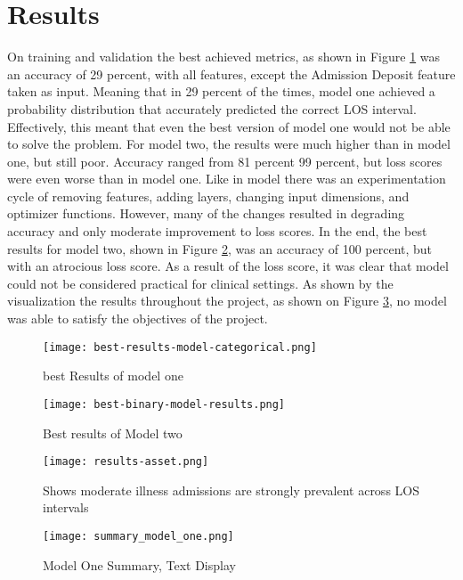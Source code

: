 \documentclass[sigconf,authorversion]{acmart}
\begin{document}
\section{Results}
 On training and validation the best achieved metrics, as shown in Figure \ref{fig: best_metric_model_one} was an accuracy of 29 percent, with all features, except the Admission Deposit feature taken as input. Meaning that in 29 percent of the times, model one achieved a probability distribution that accurately predicted the correct LOS interval. Effectively, this meant that even the best version of model one would not be able to solve the problem.
 For model two, the results were much higher than in model one, but still poor. Accuracy ranged from 81 percent 99 percent, but loss scores were even worse than in model one. Like in model there was an experimentation cycle of removing features, adding layers, changing input dimensions, and optimizer functions. However, many of the changes resulted in degrading accuracy and only moderate improvement to loss scores. In the end, the best results for model two, shown in Figure \ref{fig: best_metric_model_two}, was an accuracy of 100 percent, but with an atrocious loss score. As a result of the loss score, it was clear that model could not be considered practical for clinical settings. As shown by the visualization the results throughout the project, as shown on Figure \ref{fig: results-summary}, no model was able to satisfy the objectives of the project.
%
 \begin{figure}[h]
    \centering
    \texttt{[image: best-results-model-categorical.png]}
    \caption{best Results of model one}
    \label{fig: best_metric_model_one}
\end{figure}
\begin{figure}[h]
    \centering
    \texttt{[image: best-binary-model-results.png]}
    \caption{Best results of Model two}
    \label{fig: best_metric_model_two}
\end{figure}
\begin{figure}[h]
    \centering
    \texttt{[image: results-asset.png]}
    \caption{Shows moderate  illness admissions are strongly prevalent across LOS intervals }
    \label{fig: results-summary}
\end{figure}
\begin{figure}[h]
    \centering
    \texttt{[image: summary\_model\_one.png]}
    \caption{Model One Summary, Text Display}
    \label{fig:summary_output_model_one}
\end{figure}
%
\end{document}
